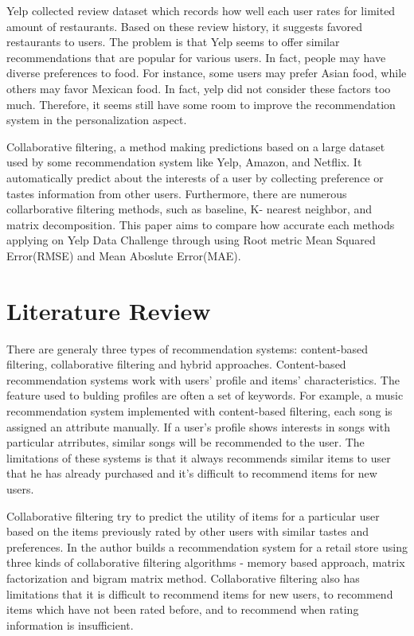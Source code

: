 \documentclass{llncs}
\begin{document}
Yelp collected review dataset which records how well each user rates for limited amount of restaurants. Based on these review history, it suggests favored restaurants to users. The problem is that Yelp seems to offer similar recommendations that are popular for various users. In fact, people may have diverse preferences to food. For instance, some users may prefer Asian food, while others may favor Mexican food. In fact, yelp did not consider these factors too much. Therefore, it seems still have some room to improve the recommendation system in the personalization aspect.

Collaborative filtering, a method making predictions based on a large dataset used by some recommendation system like Yelp, Amazon, and Netflix. It automatically predict about the interests of a user by collecting preference or tastes information from other users. Furthermore, there are numerous collarborative filtering methods, such as baseline, K- nearest neighbor, and matrix decomposition. This paper aims to compare how accurate each methods applying on Yelp Data Challenge through using Root metric Mean Squared Error(RMSE) and Mean Aboslute Error(MAE).

\section{Literature Review}
There are generaly three types of recommendation systems: content-based filtering, collaborative filtering and hybrid approaches. Content-based recommendation systems work with users’ profile and items’ characteristics. The feature used to bulding profiles are often a set of keywords. For example, a music recommendation system\cite{MJ} implemented with content-based filtering, each song is assigned an attribute manually. If a user’s profile shows interests in songs with particular atrributes, similar songs will be recommended to the user. The limitations of these systems is that it always recommends similar items to user that he has already purchased and it’s difficult to recommend items for new users. 

Collaborative filtering try to predict the utility of items for a particular user based on the items previously rated by other users with similar tastes and preferences. In\cite{Bruno} the author builds a recommendation system for a retail store using three kinds of collaborative filtering algorithms - memory based approach, matrix factorization and bigram matrix method. Collaborative filtering also has limitations that it is difficult to recommend items for new users, to recommend items which have not been rated before, and to recommend when rating information is insufficient. 
\end{document}
